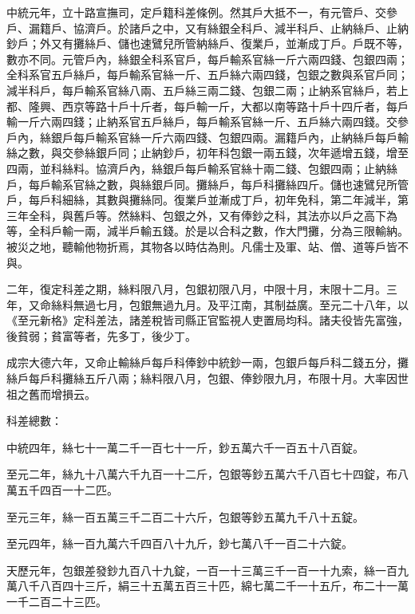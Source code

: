 \begin{pinyinscope}
 中統元年，立十路宣撫司，定戶籍科差條例。然其戶大抵不一，有元管戶、交參戶、漏籍戶、協濟戶。於諸戶之中，又有絲銀全科戶、減半科戶、止納絲戶、止納鈔戶；外又有攤絲戶、儲也速鷿兒所管納絲戶、復業戶，並漸成丁戶。戶既不等，數亦不同。元管戶內，絲銀全科系官戶，每戶輸系官絲一斤六兩四錢、包銀四兩；全科系官五戶絲戶，每戶輸系官絲一斤、五戶絲六兩四錢，包銀之數與系官戶同；減半科戶，每戶輸系官絲八兩、五戶絲三兩二錢、包銀二兩；止納系官絲戶，若上都、隆興、西京等路十戶十斤者，每戶輸一斤，大都以南等路十戶十四斤者，每戶輸一斤六兩四錢；止納系官五戶絲戶，每戶輸系官絲一斤、五戶絲六兩四錢。交參戶內，絲銀戶每戶輸系官絲一斤六兩四錢、包銀四兩。漏籍戶內，止納絲戶每戶輸絲之數，與交參絲銀戶同；止納鈔戶，初年科包銀一兩五錢，次年遞增五錢，增至四兩，並科絲料。協濟戶內，絲銀戶每戶輸系官絲十兩二錢、包銀四兩；止納絲戶，每戶輸系官絲之數，與絲銀戶同。攤絲戶，每戶科攤絲四斤。儲也速鷿兒所管戶，每戶科細絲，其數與攤絲同。復業戶並漸成丁戶，初年免科，第二年減半，第三年全科，與舊戶等。然絲料、包銀之外，又有俸鈔之科，其法亦以戶之高下為等，全科戶輸一兩，減半戶輸五錢。於是以合科之數，作大門攤，分為三限輸納。被災之地，聽輸他物折焉，其物各以時估為則。凡儒士及軍、站、僧、道等戶皆不與。



 二年，復定科差之期，絲料限八月，包銀初限八月，中限十月，末限十二月。三年，又命絲料無過七月，包銀無過九月。及平江南，其制益廣。至元二十八年，以《至元新格》定科差法，諸差稅皆司縣正官監視人吏置局均科。諸夫役皆先富強，後貧弱；貧富等者，先多丁，後少丁。



 成宗大德六年，又命止輸絲戶每戶科俸鈔中統鈔一兩，包銀戶每戶科二錢五分，攤絲戶每戶科攤絲五斤八兩；絲料限八月，包銀、俸鈔限九月，布限十月。大率因世祖之舊而增損云。



 科差總數：



 中統四年，絲七十一萬二千一百七十一斤，鈔五萬六千一百五十八百錠。



 至元二年，絲九十八萬六千九百一十二斤，包銀等鈔五萬六千八百七十四錠，布八萬五千四百一十二匹。



 至元三年，絲一百五萬三千二百二十六斤，包銀等鈔五萬九千八十五錠。



 至元四年，絲一百九萬六千四百八十九斤，鈔七萬八千一百二十六錠。



 天歷元年，包銀差發鈔九百八十九錠，一百一十三萬三千一百一十九索，絲一百九萬八千八百四十三斤，絹三十五萬五百三十匹，綿七萬二千一十五斤，布二十一萬一千二百二十三匹。




\end{pinyinscope}
